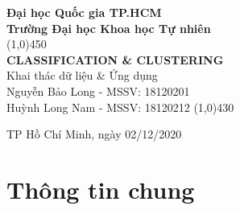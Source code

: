 \documentclass[a4paper, 12pt]{article}
\begin{document}
\begin{titlepage}
    \begin{center}
        \vspace*{1cm}
        \Large\textbf{Đại học Quốc gia TP.HCM\\Trường Đại học Khoa học Tự nhiên}\\

        \vfill
        \line(1,0){450}\\[4mm]
        \LARGE\textbf{\MakeUppercase{Classification \& Clustering}}\\[3mm]
        \Large{Khai thác dữ liệu \& Ứng dụng}\\[3mm]
        \Large{Nguyễn Bảo Long - MSSV: 18120201}\\
        \Large{Huỳnh Long Nam - MSSV: 18120212}
        \line(1,0){430}\\
        \vfill

        \vfill
        TP Hồ Chí Minh, ngày 02/12/2020
    \end{center}
\end{titlepage}

\tableofcontents
\thispagestyle{empty}
\clearpage

\section{Thông tin chung}
\end{document}
